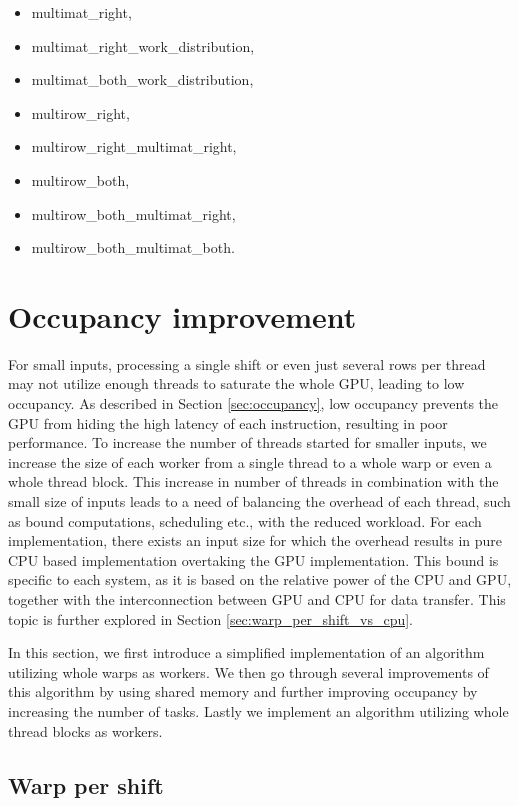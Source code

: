 \begin{itemize}
	\item multimat\_right,
	\item multimat\_right\_work\_distribution,
	\item multimat\_both\_work\_distribution,
	\item multirow\_right,
	\item multirow\_right\_multimat\_right,
	\item multirow\_both,
	\item multirow\_both\_multimat\_right,
	\item multirow\_both\_multimat\_both.
\end{itemize}


\section{Occupancy improvement}

For small inputs, processing a single shift or even just several rows per thread may not utilize enough threads to saturate the whole GPU, leading to low occupancy. As described in Section \ref{sec:occupancy}, low occupancy prevents the GPU from hiding the high latency of each instruction, resulting in poor performance. To increase the number of threads started for smaller inputs, we increase the size of each worker from a single thread to a whole warp or even a whole thread block. This increase in number of threads in combination with the small size of inputs leads to a need of balancing the overhead of each thread, such as bound computations, scheduling etc., with the reduced workload. For each implementation, there exists an input size for which the overhead results in pure CPU based implementation overtaking the GPU implementation. This bound is specific to each system, as it is based on the relative power of the CPU and GPU, together with the interconnection between GPU and CPU for data transfer. This topic is further explored in Section \ref{sec:warp_per_shift_vs_cpu}.

In this section, we first introduce a simplified implementation of an algorithm utilizing whole warps as workers. We then go through several improvements of this algorithm by using shared memory and further improving occupancy by increasing the number of tasks. Lastly we implement an algorithm utilizing whole thread blocks as workers.

\subsection{Warp per shift}

